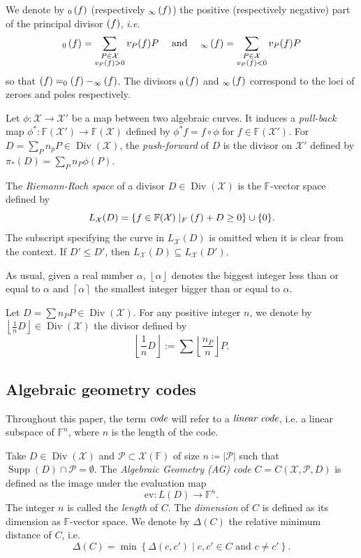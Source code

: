 \documentclass[10pt,a4paper]{article}
\newcommand\F{\mathbb{F}}
\newcommand\floor[1]{\left\lfloor #1 \right\rfloor}
\newcommand\ceil[1]{\left\lceil #1 \right\rceil}
\newcommand\poles[1]{\div_\infty\left( #1 \right)}
\newcommand\zeroes[1]{\div_0\left( #1 \right)}
\DeclareMathOperator{\Supp}{Supp}
\DeclareMathOperator{\Div}{Div}
\let\div\relax\DeclareMathOperator{\div}{div}
\newcommand{\set}[1]{\left\{#1\right\}}
\newcommand{\size}[1]{\left|#1\right|}
\newcommand\calX{\mathcal{X}}
\newcommand\calP{\mathcal{P}}
\newcommand\mydef{\coloneqq}
\theoremstyle{plain}
\theoremstyle{plain}
\theoremstyle{definition}
\theoremstyle{remark}
\theoremstyle{plain}
\begin{document}
We denote by $\zeroes{f}$ (respectively $\poles{f}$) the positive (respectively negative) part of the principal divisor $\div(f)$, \textit{i.e.}
\[ \zeroes{f}=\sum_{\substack{P \in \calX\\ v_P(f) >0 }} v_P(f) P \quad \text{  and  } \quad \poles{f}=\sum_{\substack{P \in \calX\\ v_P(f) <0 }} v_P(f) P\]
so that $\div(f)=\zeroes{f} - \poles{f}$. The divisors $\zeroes{f}$ and $\poles{f}$ correspond to the loci of zeroes and poles respectively.

Let $\phi: \calX \rightarrow \calX'$ be a map between two algebraic curves. It induces a \emph{pull-back} map ${\phi^*:\F(\calX') \rightarrow \F(\calX)}$ defined by $\phi^* f =f \circ \phi$ for $f \in \F(\calX')$. For $D=\sum_P n_p P \in \Div(\calX)$, the \emph{push-forward} of $D$ is the divisor on $\calX'$ defined by $\pi_*(D)=\sum_P n_P \phi(P)$.

The \emph{Riemann-Roch space} of a divisor $D \in \Div(\calX)$ is the $\F$-vector space defined by
\[L_\calX(D)=\{f \in \F(\calX) \mid \div_{F}(f) + D \geq 0\}\cup\{0\}.\]
The subscript specifying the curve in $L_\calX(D)$ is omitted when it is clear from the context. If $D' \leq D'$, then $L_\calX(D) \subseteq L_\calX(D')$.

As usual, given a real number $\alpha$, $\floor{\alpha}$ denotes the biggest integer less than or equal to $\alpha$ and $\ceil{\alpha}$ the smallest integer bigger than or equal to $\alpha$.
\begin{definition}\label{def:floor_div}
	Let $D = \sum n_P P \in \Div(\calX)$. For any positive integer $n$, we denote by ${\floor{\frac{1}{n}D}\in \Div(\calX)}$ the divisor defined by 
	\[\floor{\frac{1}{n}D}:=\sum \floor{\frac{n_P}{n}} P.\]
\end{definition}

\subsection{Algebraic geometry codes}
Throughout this paper, the term $\emph{code}$ will refer to a $\emph{linear code}$, i.e. a linear subspace of $\F^n$, where $n$ is the length of the code.

Take $D \in \Div(\calX)$ and $\calP \subset \calX(\F)$ of size $n\mydef\size{\calP}$ such that $\Supp(D) \cap \calP = \emptyset$. The \emph{Algebraic Geometry (AG) code} $C=C(\calX,\calP,D)$ is defined as the image under the evaluation map
\[\text{ev} : L(D) \rightarrow \F^n.\]
The integer $n$ is called the \emph{length} of $C$. The \emph{dimension} of $C$ is defined as its dimension as $\F$-vector space. We denote by $\Delta(C)$ the relative minimum distance of $C$, i.e.
\[\Delta(C) = \min \set{\Delta(c, c') \mid c, c' \in C \text{ and } c \neq c'}.\]
\end{document}
